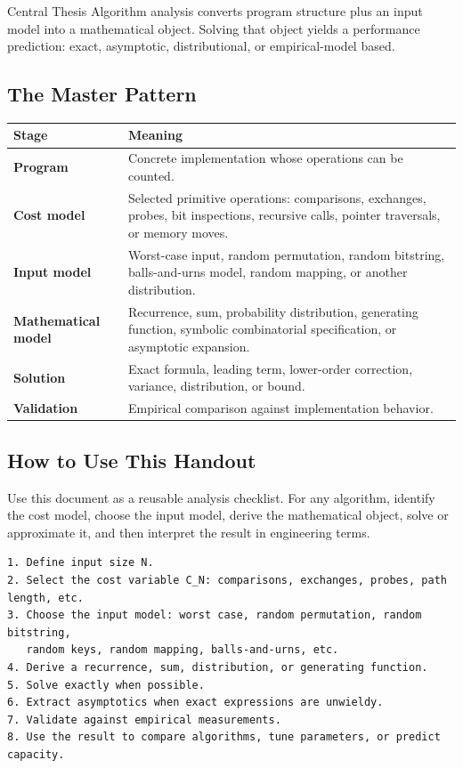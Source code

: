 \documentclass[11pt]{article}
\begin{document}
\begin{keybox}{Central Thesis}
Algorithm analysis converts program structure plus an input model into a mathematical object. Solving that object yields a performance prediction: exact, asymptotic, distributional, or empirical-model based.
\end{keybox}

\subsection{The Master Pattern}

\begin{center}
\begin{tabularx}{\textwidth}{>{\bfseries\color{HouseBlue}}L{0.20\textwidth} Y}
\toprule
Stage & Meaning \\
\midrule
Program & Concrete implementation whose operations can be counted. \\
Cost model & Selected primitive operations: comparisons, exchanges, probes, bit inspections, recursive calls, pointer traversals, or memory moves. \\
Input model & Worst-case input, random permutation, random bitstring, balls-and-urns model, random mapping, or another distribution. \\
Mathematical model & Recurrence, sum, probability distribution, generating function, symbolic combinatorial specification, or asymptotic expansion. \\
Solution & Exact formula, leading term, lower-order correction, variance, distribution, or bound. \\
Validation & Empirical comparison against implementation behavior. \\
\bottomrule
\end{tabularx}
\end{center}

\subsection{How to Use This Handout}

Use this document as a reusable analysis checklist. For any algorithm, identify the cost model, choose the input model, derive the mathematical object, solve or approximate it, and then interpret the result in engineering terms.

\begin{verbatim}
1. Define input size N.
2. Select the cost variable C_N: comparisons, exchanges, probes, path length, etc.
3. Choose the input model: worst case, random permutation, random bitstring,
   random keys, random mapping, balls-and-urns, etc.
4. Derive a recurrence, sum, distribution, or generating function.
5. Solve exactly when possible.
6. Extract asymptotics when exact expressions are unwieldy.
7. Validate against empirical measurements.
8. Use the result to compare algorithms, tune parameters, or predict capacity.
\end{verbatim}
\end{document}
